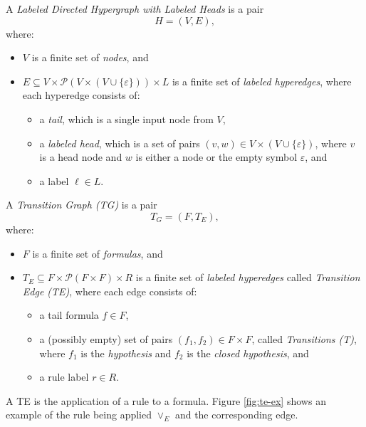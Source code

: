 \begin{definition}
A \emph{Labeled Directed Hypergraph with Labeled Heads} is a pair
\[
H = (V, E),
\]
where:
\begin{itemize}
  \item \( V \) is a finite set of \emph{nodes}, and
  \item \( E \subseteq V \times \mathcal{P}(V \times (V \cup \{\varepsilon\})) \times L \) is a finite set of \emph{labeled hyperedges}, where each hyperedge consists of:
  \begin{itemize}
    \item a \emph{tail}, which is a single input node from \( V \),
    \item a \emph{labeled head}, which is a set of pairs \( (v, w) \in V \times (V \cup \{\varepsilon\}) \), where \( v \) is a head node and \( w \) is either a node or the empty symbol \( \varepsilon \), and
    \item a label \( \ell \in L \).
  \end{itemize}
\end{itemize}
\end{definition}

\begin{definition}
A \emph{Transition Graph (TG)} is a pair
\[
T_G = (F, T_E),
\]
where:
\begin{itemize}
  \item \( F \) is a finite set of \emph{formulas}, and
  \item \( T_E \subseteq F \times \mathcal{P}(F \times F) \times R \) is a finite set of \emph{labeled hyperedges} called \emph{Transition Edge (TE)}, where each edge consists of:
  \begin{itemize}
    \item a tail formula \( f \in F \),
    \item a (possibly empty) set of pairs \( (f_1, f_2) \in F \times F \), called \emph{Transitions (T)}, where \( f_1 \) is the \emph{hypothesis} and \( f_2 \) is the \emph{closed hypothesis}, and
    \item a rule label \( r \in R \).
  \end{itemize}
\end{itemize}
\end{definition}


A TE is the application of a rule to a formula. Figure \ref{fig:te-ex} shows an example of the rule being applied \(\vee_E\) and the corresponding edge.

